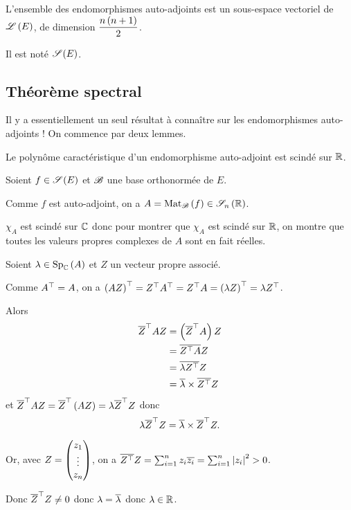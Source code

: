 \begin{cor}
L'ensemble des endomorphismes auto-adjoints est un sous-espace vectoriel de \(\mathscr{L}\left(E\right)\), de dimension \(\dfrac{n\left(n+1\right)}{2}\).
\end{cor}

Il est noté \(\sym{}[E]\).

\subsection{Théorème spectral}

Il y a essentiellement un seul résultat à connaître sur les endomorphismes auto-adjoints ! On commence par deux lemmes.

\begin{lem}
Le polynôme caractéristique d'un endomorphisme auto-adjoint est scindé sur \(\mathbb{R}\).
\end{lem}

\begin{dem}
Soient \(f\in\sym{}[E]\) et \(\mathscr{B}\) une base orthonormée de \(E\).

Comme \(f\) est auto-adjoint, on a \(A=\Mat{f}\in\sym{n}[\R]\).

\(\chi_A\) est scindé sur \(\mathbb{C}\) donc pour montrer que \(\chi_A\) est scindé sur \(\mathbb{R}\), on montre que toutes les valeurs propres complexes de \(A\) sont en fait réelles.

Soient \(\lambda\in\Sp[\C]{A}\) et \(Z\) un vecteur propre associé.

Comme \(A^{\top}=A\), on a \(\left(AZ\right)^{\top}=Z^{\top}A^{\top}=Z^{\top}A=\left(\lambda Z\right)^{\top}=\lambda Z^{\top}\).

Alors \[\begin{aligned}
\overline{Z}^{\top}AZ&=\left(\overline{Z}^{\top}A\right)Z \\
&=\overline{Z^{\top}A}Z \\
&=\overline{\lambda Z^{\top}}Z \\
&=\overline{\lambda}\times\overline{Z^{\top}}Z
\end{aligned}\] et \(\overline{Z}^{\top}AZ=\overline{Z}^{\top}\left(AZ\right)=\lambda\overline{Z}^{\top}Z\) donc \[\lambda\overline{Z}^{\top}Z=\overline{\lambda}\times\overline{Z}^{\top}Z.\]

Or, avec \(Z=\begin{pmatrix}z_1\\\vdots\\z_n\end{pmatrix}\), on a \(\overline{Z^{\top}}Z=\sum_{i=1}^nz_i\overline{z_i}=\sum_{i=1}^n\left\lvert z_i\right\rvert^2>0\).

Donc \(\overline{Z}^{\top}Z\not=0\) donc \(\lambda=\overline{\lambda}\) donc \(\lambda\in\mathbb{R}\).
\end{dem}

